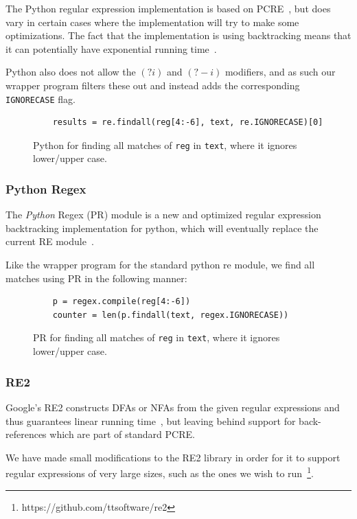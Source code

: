 \documentclass[12pt]{article}
\theoremstyle{definition}
\begin{document}
The Python regular expression implementation is based on PCRE~\cite{pcre}, but does vary in certain cases where the implementation will try to make some optimizations. The fact that the implementation is using backtracking means that it can potentially have exponential running time~\cite{pcre-running-time}.

Python also does not allow the $(?i)$ and $(?-i)$ modifiers, and as such our wrapper program filters these out and instead adds the corresponding \texttt{IGNORECASE} flag.

\begin{figure}[H]
	\begin{lstlisting}
	results = re.findall(reg[4:-6], text, re.IGNORECASE)[0]
	\end{lstlisting}
	\caption{Python for finding all matches of \texttt{reg} in \texttt{text}, where it ignores lower/upper case.}
\end{figure}


\subsubsection{Python Regex}

The \mbox{\emph{Python}} Regex (PR) module is a new and optimized regular expression backtracking implementation for python, which will eventually replace the current RE module~\cite{python-regex}.

Like the wrapper program for the standard python re module, we find all matches using PR in the following manner:
\begin{figure}[H]
	\begin{lstlisting}
	p = regex.compile(reg[4:-6])
	counter = len(p.findall(text, regex.IGNORECASE))
	\end{lstlisting}
	\caption{PR for finding all matches of \texttt{reg} in \texttt{text}, where it ignores lower/upper case.}
\end{figure}


\subsubsection{RE2}

Google's RE2 constructs DFAs or NFAs from the given regular expressions and thus guarantees linear running time~\cite{pcre-running-time}, but leaving behind support for back-references which are part of standard PCRE.

We have made small modifications to the RE2 library in order for it to support regular expressions of very large sizes, such as the ones we wish to run~\footnote{https://github.com/ttsoftware/re2}.
\end{document}
